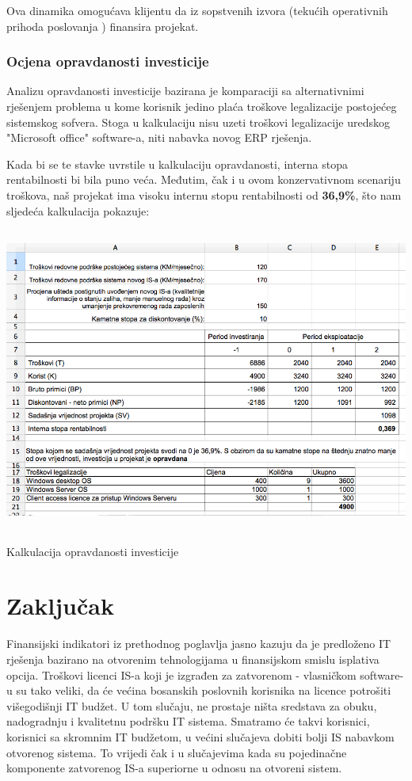 \documentclass[times, utf8, seminar]{fit}
\begin{document}
Ova dinamika omogućava klijentu da iz sopstvenih izvora (tekućih operativnih prihoda poslovanja \cite{prasorep}) finansira projekat.

\subsection{Ocjena opravdanosti investicije}

Analizu opravdanosti investicije bazirana je komparaciji sa alternativnimi rješenjem problema u kome korisnik jedino plaća troškove legalizacije postojećeg sistemskog sofvera.
Stoga u kalkulaciju nisu uzeti troškovi legalizacije uredskog "Microsoft office" software-a, niti nabavka novog ERP rješenja.

Kada bi se te stavke uvrstile u kalkulaciju opravdanosti, interna stopa rentabilnosti bi bila puno veća. Međutim, čak i u ovom konzervativnom scenariju troškova, naš projekat ima visoku internu stopu rentabilnosti od \textbf{36,9\%}, što nam sljedeća kalkulacija pokazuje:

\begin{table}[!h]
\centering
\includegraphics[height=10cm]{img/kalk_opravdanost.png}
\caption{Kalkulacija opravdanosti investicije}
\end{table}

\chapter{Zaključak}

Finansijski indikatori iz prethodnog poglavlja jasno kazuju da je predloženo IT rješenja bazirano na otvorenim tehnologijama u finansijskom smislu isplativa opcija. Troškovi licenci IS-a koji je izgrađen za zatvorenom - vlasničkom software-u  su tako veliki, da će većina bosanskih poslovnih korisnika na licence potrošiti višegodišnji IT budžet. U tom slučaju, ne prostaje ništa sredstava za obuku, nadogradnju i kvalitetnu podršku IT sistema. Smatramo će takvi korisnici, korisnici sa skromnim IT budžetom, u većini slučajeva dobiti bolji IS nabavkom otvorenog sistema. To vrijedi čak i u slučajevima kada su pojedinačne komponente zatvorenog IS-a superiorne u odnosu na otvoreni sistem.
\end{document}
